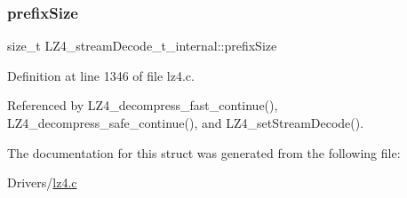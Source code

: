 \mbox{\label{structLZ4__streamDecode__t__internal_a44f5f7acc14c2bb3865eccd5372107c4}} 
\subsubsection{\texorpdfstring{prefix\+Size}{prefixSize}}
{\footnotesize\ttfamily size\+\_\+t L\+Z4\+\_\+stream\+Decode\+\_\+t\+\_\+internal\+::prefix\+Size}



Definition at line 1346 of file lz4.\+c.



Referenced by L\+Z4\+\_\+decompress\+\_\+fast\+\_\+continue(), L\+Z4\+\_\+decompress\+\_\+safe\+\_\+continue(), and L\+Z4\+\_\+set\+Stream\+Decode().



The documentation for this struct was generated from the following file\+:\begin{DoxyCompactItemize}
\item 
Drivers/\mbox{\hyperlink{lz4_8c}{lz4.\+c}}\end{DoxyCompactItemize}
